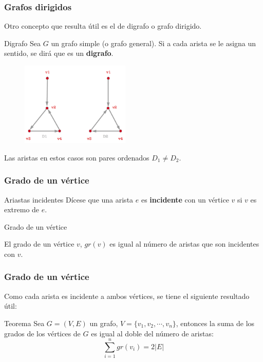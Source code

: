 \documentclass{beamer}
\begin{document}
\begin{frame}
\frametitle{Grafos dirigidos}
Otro concepto que resulta \'util es el de digrafo o grafo dirigido.
\begin{block}{Digrafo}
Sea $G$ un grafo simple (o grafo general). Si a cada arista se le asigna un sentido, se dir\'a que es un \textbf{digrafo}. 

\end{block}

\begin{figure}[h]
 \label{fig:volumen}
\centering
\includegraphics[height=4cm]{g5}
\end{figure}

Las aristas en estos casos son pares ordenados $D_1\neq D_2$.

\end{frame}





\begin{frame}
\frametitle{Grado de un v\'ertice}

\begin{block}{Ariastas incidentes}
D\'icese que una arista $e$ es \textbf{incidente} con un v\'ertice $v$ si $v$ es extremo de $e$.
\end{block}

\begin{block}{Grado de un v\'ertice}

El grado de un v\'ertice $v$, $gr(v)$ es igual al n\'umero de aristas que son incidentes con $v$.
\end{block}
\end{frame}




\begin{frame}
\frametitle{Grado de un v\'ertice}

Como cada arista es incidente a ambos v\'ertices, se tiene el siguiente resultado \'util:
\begin{block}{Teorema}
Sea $G=(V,E)$ un grafo, $V=\{v_1,v_2,\cdots, v_n\}$, entonces la suma de los grados de los v\'ertices de $G$ es igual al doble del n\'umero de aristas:
\[\displaystyle\sum_{i=1}^n gr(v_i) = 2|E|\]
\end{block}
\end{frame}
\end{document}
